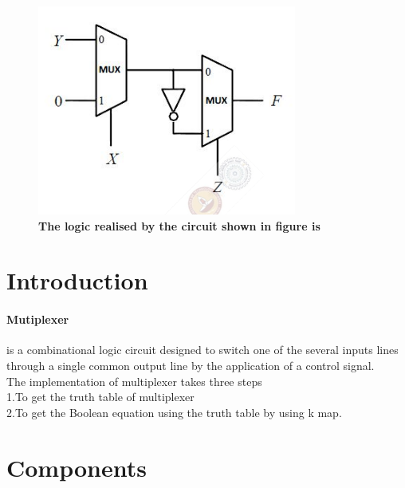 \documentclass[10pt, a4paper]{article}
\title{\mytitle}
\author{\myauthor\hspace{1em}\\\contact\\IITH-Future Wireless Communications(FWC22097)\hspace{0.5em}\hspace{0.5em}\mymodule}
\date{}
\begin{document}
 \maketitle
     \tableofcontents 
    \begin{figure}
        \centering
        \includegraphics[width=\linewidth]{mux.png}
        \caption{\textbf{The logic realised by the circuit shown in figure is}}
        \label{fig:my_label}
    \end{figure}
  \textbf{}{\mykeywords}
\section{Introduction}
  
    \paragraph{Mutiplexer}
    is a combinational  logic circuit designed to switch one  of  the several  inputs lines through a single common output line by the application of a control signal.
      \\ The implementation of multiplexer takes three steps\\1.To get the truth table of multiplexer\\2.To get the Boolean equation using the truth table by using k map.\\
      \section{Components}
     
\end{document}
